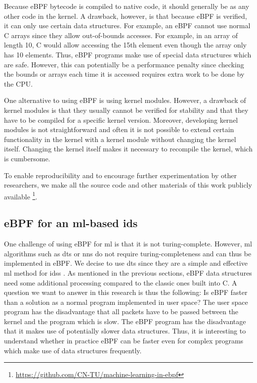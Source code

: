 \documentclass[conference]{IEEEtran}
\begin{document}
Because eBPF bytecode is compiled to native code, it should generally be as any other code in the kernel. A drawback, however, is that because eBPF is verified, it can only use certain data structures. For example, an eBPF cannot use normal C arrays since they allow out-of-bounds accesses. For example, in an array of length 10, C would allow accessing the 15th element even though the array only has 10 elements. Thus, eBPF programs make use of special data structures which are safe. However, this can potentially be a performance penalty since checking the bounds or arrays each time it is accessed requires extra work to be done by the CPU. 

One alternative to using eBPF is using kernel modules. However, a drawback of kernel modules is that they usually cannot be verified for stability and that they have to be compiled for a specific kernel version. Moreover, developing kernel modules is not straightforward and often it is not possible to extend certain functionality in the kernel with a kernel module without changing the kernel itself. Changing the kernel itself makes it necessary to recompile the kernel, which is cumbersome. 

To enable reproducibility and to encourage further experimentation by other researchers, we make all the source code and other materials of this work publicly available \footnote{\url{https://github.com/CN-TU/machine-learning-in-ebpf}}.

\subsection{eBPF for an \gls{ml}-based \gls{ids}}

One challenge of using eBPF for \gls{ml} is that it is not turing-complete. However, \gls{ml} algorithms such as \glspl{dt} or \glspl{nn} do not require turing-completeness and can thus be implemented in eBPF. We decise to use \glspl{dt} since they are a simple and effective \gls{ml} method for \glspl{ids} \cite{iglesias_ntarc_2020}. As mentioned in the previous sections, eBPF data structures need some additional processing compared to the classic ones built into C. A question we want to answer in this research is thus the following: Is eBPF faster than a solution as a normal program implemented in user space? The user space program has the disadvantage that all packets have to be passed between the kernel and the program which is slow. The eBPF program has the disadvantage that it makes use of potentially slower data structures. Thus, it is interesting to understand whether in practice eBPF can be faster even for complex programs which make use of data structures frequently. 
\end{document}
